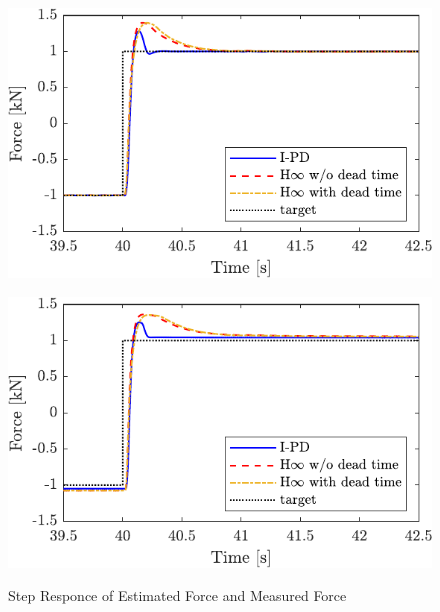 \begin{figure}[t]
    \begin{minipage}{\minipageratio\hsize}
    \centering
        \includegraphics[keepaspectratio, width = \minifigwidth]{contents/ForceControl/figure/1115/crop-1115_diff_estforce_step.pdf}
        \label{fig4:crop-1115_diff_estforce_step}
    \end{minipage} 
    \begin{minipage}{\minipageratio\hsize}
    \centering
        \includegraphics[keepaspectratio, width = \minifigwidth]{contents/ForceControl/figure/1115/crop-1115_diff_force_step.pdf}
        \label{fig4:crop-1115_diff_force_step}
    \end{minipage}
    \caption{Step Responce of Estimated Force and Measured Force}
    \label{fig4:crop-1115_diff_step}
\end{figure}
